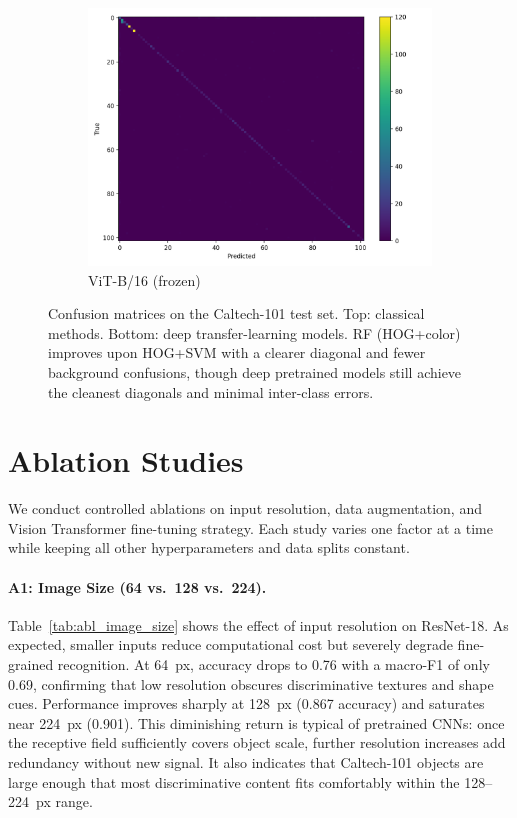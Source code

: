 \documentclass[11pt]{article}
\begin{document}
\begin{figure}[H]
\begin{subfigure}[t]{0.32\textwidth}
    \includegraphics[width=\linewidth]{results/vitb16_224_freeze/confusion_matrix.png}
    \caption{ViT-B/16 (frozen)}\label{fig:cms-vit}
  \end{subfigure}

  \caption{Confusion matrices on the Caltech-101 test set.
  Top: classical methods. Bottom: deep transfer-learning models.
  RF (HOG+color) improves upon HOG+SVM with a clearer diagonal and fewer background confusions,
  though deep pretrained models still achieve the cleanest diagonals and minimal inter-class errors.}
  \label{fig:cms}
\end{figure}



\section{Ablation Studies}
\label{section:Ablation}


We conduct controlled ablations on input resolution, data augmentation, and Vision Transformer fine-tuning strategy.
Each study varies one factor at a time while keeping all other hyperparameters and data splits constant.

\paragraph{A1: Image Size (64 vs.\ 128 vs.\ 224).}
Table~\ref{tab:abl_image_size} shows the effect of input resolution on ResNet-18.
As expected, smaller inputs reduce computational cost but severely degrade fine-grained recognition.
At \SI{64}{px}, accuracy drops to 0.76 with a macro-F1 of only 0.69, confirming that low resolution
obscures discriminative textures and shape cues.
Performance improves sharply at \SI{128}{px} (0.867 accuracy) and saturates near \SI{224}{px} (0.901).
This diminishing return is typical of pretrained CNNs: once the receptive field sufficiently covers object scale,
further resolution increases add redundancy without new signal.
It also indicates that Caltech-101 objects are large enough that most discriminative content
fits comfortably within the 128–224~px range.
\end{document}
